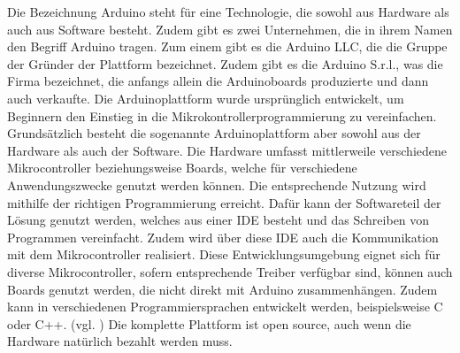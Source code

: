Die Bezeichnung Arduino steht für eine Technologie, die sowohl aus Hardware als auch aus Software besteht. Zudem gibt es zwei Unternehmen, die in ihrem Namen den Begriff Arduino tragen. Zum einem gibt es die Arduino LLC, die die Gruppe der Gründer der Plattform bezeichnet. Zudem gibt es die Arduino S.r.l., was die Firma bezeichnet, die anfangs allein die Arduinoboards produzierte und dann auch verkaufte. Die Arduinoplattform wurde ursprünglich entwickelt, um Beginnern den Einstieg in die Mikrokontrollerprogrammierung zu vereinfachen. 
Grundsätzlich besteht die sogenannte Arduinoplattform aber sowohl aus der Hardware als auch der Software. Die Hardware umfasst mittlerweile verschiedene Mikrocontroller beziehungsweise Boards, welche für verschiedene Anwendungszwecke genutzt werden können. Die entsprechende Nutzung wird mithilfe der richtigen Programmierung erreicht. Dafür kann der Softwareteil der Lösung genutzt werden, welches aus einer \ac{IDE}  besteht und das Schreiben von Programmen vereinfacht. Zudem wird über diese \ac{IDE} auch die Kommunikation mit dem Mikrocontroller realisiert. Diese Entwicklungsumgebung eignet sich für diverse Mikrocontroller, sofern entsprechende Treiber verfügbar sind, können auch Boards genutzt werden, die nicht direkt mit Arduino zusammenhängen. Zudem kann in verschiedenen Programmiersprachen entwickelt werden, beispielsweise C oder C++. (vgl. \cite{.h,.f,.e,.i,.g,online.})
Die komplette Plattform ist open source, auch wenn die Hardware natürlich bezahlt werden muss. 
